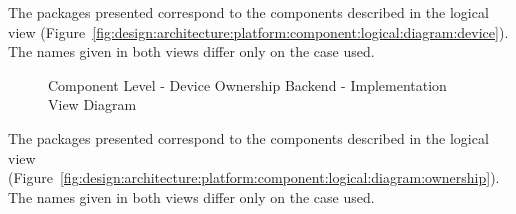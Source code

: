 %       

The packages presented correspond to the components described in the logical view (Figure~\ref{fig:design:architecture:platform:component:logical:diagram:device}). The names given in both views differ only on the case used.

\begin{figure}[H]
   \centering
   \resizebox{0.8\columnwidth}{!}
   {
      
   }
   \caption[Component Level - Device Ownership Backend - Implementation View Diagram]{Component Level - Device Ownership Backend - Implementation View Diagram}
   \label{fig:design:architecture:platform:component:development:diagram:ownership}
\end{figure}

The packages presented correspond to the components described in the logical view (Figure~\ref{fig:design:architecture:platform:component:logical:diagram:ownership}). The names given in both views differ only on the case used.
